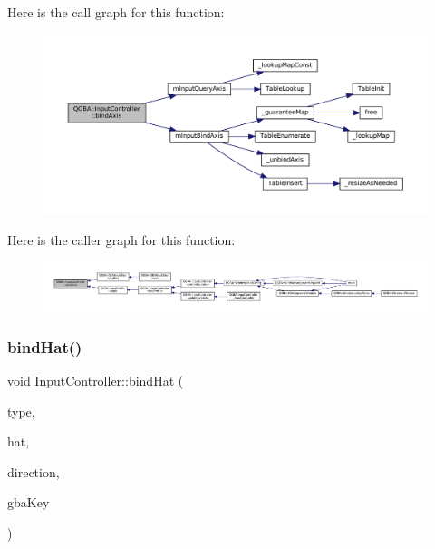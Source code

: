 Here is the call graph for this function\+:
\nopagebreak
\begin{figure}[H]
\begin{center}
\leavevmode
\includegraphics[width=350pt]{class_q_g_b_a_1_1_input_controller_a3d393ba04e9b5671104d93dad40f495b_cgraph}
\end{center}
\end{figure}
Here is the caller graph for this function\+:
\nopagebreak
\begin{figure}[H]
\begin{center}
\leavevmode
\includegraphics[width=350pt]{class_q_g_b_a_1_1_input_controller_a3d393ba04e9b5671104d93dad40f495b_icgraph}
\end{center}
\end{figure}
\mbox{\label{class_q_g_b_a_1_1_input_controller_a213ad91873af6067f50e5581e1d9b46c}} 
\subsubsection{\texorpdfstring{bind\+Hat()}{bindHat()}}
{\footnotesize\ttfamily void Input\+Controller\+::bind\+Hat (\begin{DoxyParamCaption}\item[{uint32\+\_\+t}]{type,  }\item[{\mbox{\hyperlink{ioapi_8h_a787fa3cf048117ba7123753c1e74fcd6}{int}}}]{hat,  }\item[{\mbox{\hyperlink{class_q_g_b_a_1_1_gamepad_hat_event_ae3f20662c61b054e5344aafb9d843837}{Gamepad\+Hat\+Event\+::\+Direction}}}]{direction,  }\item[{G\+B\+A\+Key}]{gba\+Key }\end{DoxyParamCaption})}

